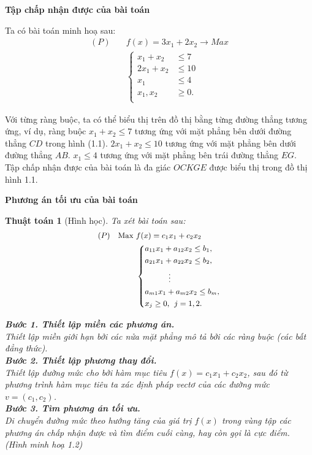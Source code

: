 \documentclass[12pt,a4paper]{report}
\newtheorem{ttoan}{Thuật toán}
\begin{document}
 \textbf{Tập chấp nhận được của bài toán}

Ta có bài toán minh hoạ sau:
\begin{equation}
	\begin{split}
	(P) \quad & f(x) = 3x_1 + 2x_2 \longrightarrow Max \\
		& \left\{\begin{split}
		x_1 + x_2 &\leq 7 \\
		2x_1 + x_2 &\leq 10 \\
		x_1 &\leq 4 \\
		x_1, x_2 &\geq 0. \\
		\end{split}\right.    
	\end{split}
\end{equation}

Với từng ràng buộc, ta có thể biểu thị trên đồ thị bằng từng đường thẳng tương ứng, ví dụ, ràng buộc
$x_1 + x_2 \leq 7$
tương ứng với mặt phẳng bên dưới đường thẳng $CD$ trong hình (1.1).
$2x_1 + x_2 \leq 10$
tương ứng với mặt phẳng bên dưới đường thẳng $AB$.
$x_1 \leq 4$
tương ứng với mặt phẳng bên trái đường thẳng $EG$. Tập chấp nhận được của bài toán là đa giác $OCKGE$ được biểu thị trong đồ thị hình 1.1.

 \textbf{Phương án tối ưu của bài toán}

\begin{ttoan}[Hình học]
\setlength{\parindent}{4em}
Ta xét bài toán sau:
\begin{equation} \small
	\begin{split}
	(P) \quad \text{Max } & f(x) = c_1x_1 + c_2x_2 \\
		& \left\{
		\begin{split}
        & a_{11}x_1 +a_{12}x_2 \leq b_1, \\
        & a_{21}x_1 +a_{22}x_2 \leq b_2, \\
        & \quad \quad \quad \vdots \\
        & a_{m1}x_1 +a_{m2}x_2 \leq b_m, \\
		& x_j \geq 0, \:\: j=1,2.
		\end{split}
		\right.    
	\end{split}
\end{equation}

\noindent \textbf{Bước 1. Thiết lập miền các phương án.} \\
Thiết lập miền giới hạn bởi các nửa mặt phẳng mô tả bởi các ràng buộc (các bất đẳng thức). \\
\noindent \textbf{Bước 2. Thiết lập phương thay đổi.} \\
Thiết lập đường mức cho bởi hàm mục tiêu $f(x)=c_1x_1+c_2x_2$, sau đó từ phương trình hàm mục tiêu ta xác định pháp vectơ của các đường mức $v=(c_1, c_2)$. \\
\noindent \textbf{Bước 3. Tìm phương án tối ưu.} \\
Di chuyển đường mức theo hướng tăng của giá trị $f(x)$ trong vùng tập các phương án chấp nhận được và tìm điểm cuối cùng, hay còn gọi là cực điểm. (Hình minh hoạ 1.2)
\end{ttoan}
\end{document}

